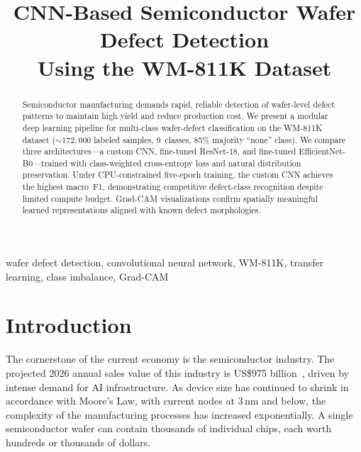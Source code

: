 \documentclass[conference]{IEEEtran}
\begin{document}
\title{CNN-Based Semiconductor Wafer Defect Detection\\Using the WM-811K Dataset}

\author{
}

\maketitle

\begin{abstract}
Semiconductor manufacturing demands rapid, reliable detection of wafer-level
defect patterns to maintain high yield and reduce production cost. We present
a modular deep learning pipeline for multi-class wafer-defect classification
on the WM-811K dataset (${\sim}172{,}000$ labeled samples, 9~classes, 85\%
majority ``none'' class). We compare three architectures---a custom CNN,
fine-tuned ResNet-18, and fine-tuned EfficientNet-B0---trained with
class-weighted cross-entropy loss and natural distribution preservation.
Under CPU-constrained five-epoch training, the custom CNN achieves the
highest macro~F1, demonstrating competitive defect-class recognition despite
limited compute budget. Grad-CAM visualizations confirm spatially meaningful
learned representations aligned with known defect morphologies.
\end{abstract}

\begin{IEEEkeywords}
wafer defect detection, convolutional neural network, WM-811K, transfer
learning, class imbalance, Grad-CAM
\end{IEEEkeywords}

\section{Introduction}
\label{sec:introduction}

The cornerstone of the current economy is the semiconductor industry. The
projected 2026 annual sales value of this industry is US\$975
billion~\cite{sia2024}, driven by intense demand for AI infrastructure. As
device size has continued to shrink in accordance with Moore's Law, with
current nodes at 3\,nm and below, the complexity of the manufacturing
processes has increased exponentially. A single semiconductor wafer can contain
thousands of individual chips, each worth hundreds or thousands of dollars.
\end{document}
